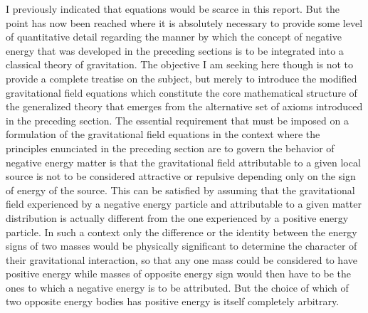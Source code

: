 \documentclass[notitlepage,12pt]{report}
\begin{document}
I previously indicated that equations would be scarce in this report. But the point has now been reached where it is absolutely necessary to provide some level of quantitative detail regarding the manner by which the concept of negative energy that was developed in the preceding sections is to be integrated into a classical theory of gravitation. The objective I am seeking here though is not to provide a complete treatise on the subject, but merely to introduce the modified gravitational field equations which constitute the core mathematical structure of the generalized theory that emerges from the alternative set of axioms introduced in the preceding section. The essential requirement that must be imposed on a formulation of the gravitational field equations in the context where the principles enunciated in the preceding section are to govern the behavior of negative energy matter is that the gravitational field attributable to a given local source is not to be considered attractive or repulsive depending only on the sign of energy of the source. This can be satisfied by assuming that the gravitational field experienced by a negative energy particle and attributable to a given matter distribution is actually different from the one experienced by a positive energy particle. In such a context only the difference or the identity between the energy signs of two masses would be physically significant to determine the character of their gravitational interaction, so that any one mass could be considered to have positive energy while masses of opposite energy sign would then have to be the ones to which a negative energy is to be attributed. But the choice of which of two opposite energy bodies has positive energy is itself completely arbitrary.
\end{document}
